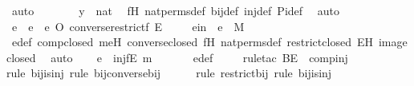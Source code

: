 \begin{isabellebody}
\ auto\isanewline
\ \ \ \ \isamarkupfalse%
\ \isamarkupfalse%
\ {\isachardoublequoteopen}y\ {\isasymin}\ nat{\isachardoublequoteclose}\ \isamarkupfalse%
\ fH\ nat{\isacharunderscore}{\kern0pt}perms{\isacharunderscore}{\kern0pt}def\ bij{\isacharunderscore}{\kern0pt}def\ inj{\isacharunderscore}{\kern0pt}def\ Pi{\isacharunderscore}{\kern0pt}def\ \isamarkupfalse%
\ auto\isanewline
\ \ \isamarkupfalse%
\isanewline
\isanewline
\ \ \isamarkupfalse%
\ e{\isacharprime}{\kern0pt}\ \ {\isachardoublequoteopen}e{\isacharprime}{\kern0pt}\ {\isasymequiv}\ e\ O\ converse{\isacharparenleft}{\kern0pt}restrict{\isacharparenleft}{\kern0pt}f{\isacharcomma}{\kern0pt}\ E{\isacharparenright}{\kern0pt}{\isacharparenright}{\kern0pt}{\isachardoublequoteclose}\ \isanewline
\ \ \isamarkupfalse%
\ e{\isacharprime}{\kern0pt}in\ {\isacharcolon}{\kern0pt}\ {\isachardoublequoteopen}e{\isacharprime}{\kern0pt}\ {\isasymin}\ M{\isachardoublequoteclose}\ \isamarkupfalse%
\ e{\isacharprime}{\kern0pt}{\isacharunderscore}{\kern0pt}def\ comp{\isacharunderscore}{\kern0pt}closed\ meH\ converse{\isacharunderscore}{\kern0pt}closed\ fH\ nat{\isacharunderscore}{\kern0pt}perms{\isacharunderscore}{\kern0pt}def\ restrict{\isacharunderscore}{\kern0pt}closed\ EH\ image{\isacharunderscore}{\kern0pt}closed\ \isamarkupfalse%
\ auto\isanewline
\isanewline
\ \ \isamarkupfalse%
\ {\isachardoublequoteopen}e{\isacharprime}{\kern0pt}\ {\isasymin}\ inj{\isacharparenleft}{\kern0pt}f{\isacharbackquote}{\kern0pt}{\isacharbackquote}{\kern0pt}E{\isacharcomma}{\kern0pt}\ m{\isacharparenright}{\kern0pt}{\isachardoublequoteclose}\ \isanewline
\ \ \ \ \isamarkupfalse%
\ e{\isacharprime}{\kern0pt}{\isacharunderscore}{\kern0pt}def\isanewline
\ \ \ \ \isamarkupfalse%
{\isacharparenleft}{\kern0pt}rule{\isacharunderscore}{\kern0pt}tac\ B{\isacharequal}{\kern0pt}E\ \ comp{\isacharunderscore}{\kern0pt}inj{\isacharparenright}{\kern0pt}\isanewline
\ \ \ \ \ \isamarkupfalse%
{\isacharparenleft}{\kern0pt}rule\ bij{\isacharunderscore}{\kern0pt}is{\isacharunderscore}{\kern0pt}inj{\isacharcomma}{\kern0pt}\ rule\ bij{\isacharunderscore}{\kern0pt}converse{\isacharunderscore}{\kern0pt}bij{\isacharparenright}{\kern0pt}\isanewline
\ \ \ \ \ \isamarkupfalse%
{\isacharparenleft}{\kern0pt}rule\ restrict{\isacharunderscore}{\kern0pt}bij{\isacharcomma}{\kern0pt}\ rule\ bij{\isacharunderscore}{\kern0pt}is{\isacharunderscore}{\kern0pt}inj{\isacharparenright}{\kern0pt}\isanewline

\end{isabellebody}
